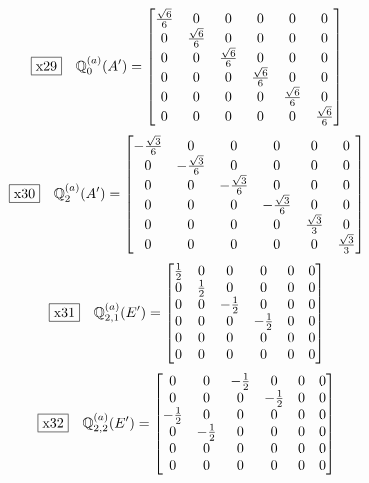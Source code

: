 \documentclass[fleqn,10pt,landscape]{jsarticle}
\begin{document}
\begin{dmath*}
\fbox{x29}\quad \mathbb{Q}_{0}^{(a)}(A^{\prime})=\begin{bmatrix} \frac{\sqrt{6}}{6} & 0 & 0 & 0 & 0 & 0 \\ 0 & \frac{\sqrt{6}}{6} & 0 & 0 & 0 & 0 \\ 0 & 0 & \frac{\sqrt{6}}{6} & 0 & 0 & 0 \\ 0 & 0 & 0 & \frac{\sqrt{6}}{6} & 0 & 0 \\ 0 & 0 & 0 & 0 & \frac{\sqrt{6}}{6} & 0 \\ 0 & 0 & 0 & 0 & 0 & \frac{\sqrt{6}}{6} \end{bmatrix}
\end{dmath*}
\begin{dmath*}
\fbox{x30}\quad \mathbb{Q}_{2}^{(a)}(A^{\prime})=\begin{bmatrix} - \frac{\sqrt{3}}{6} & 0 & 0 & 0 & 0 & 0 \\ 0 & - \frac{\sqrt{3}}{6} & 0 & 0 & 0 & 0 \\ 0 & 0 & - \frac{\sqrt{3}}{6} & 0 & 0 & 0 \\ 0 & 0 & 0 & - \frac{\sqrt{3}}{6} & 0 & 0 \\ 0 & 0 & 0 & 0 & \frac{\sqrt{3}}{3} & 0 \\ 0 & 0 & 0 & 0 & 0 & \frac{\sqrt{3}}{3} \end{bmatrix}
\end{dmath*}
\begin{dmath*}
\fbox{x31}\quad \mathbb{Q}_{2,1}^{(a)}(E^{\prime})=\begin{bmatrix} \frac{1}{2} & 0 & 0 & 0 & 0 & 0 \\ 0 & \frac{1}{2} & 0 & 0 & 0 & 0 \\ 0 & 0 & - \frac{1}{2} & 0 & 0 & 0 \\ 0 & 0 & 0 & - \frac{1}{2} & 0 & 0 \\ 0 & 0 & 0 & 0 & 0 & 0 \\ 0 & 0 & 0 & 0 & 0 & 0 \end{bmatrix}
\end{dmath*}
\begin{dmath*}
\fbox{x32}\quad \mathbb{Q}_{2,2}^{(a)}(E^{\prime})=\begin{bmatrix} 0 & 0 & - \frac{1}{2} & 0 & 0 & 0 \\ 0 & 0 & 0 & - \frac{1}{2} & 0 & 0 \\ - \frac{1}{2} & 0 & 0 & 0 & 0 & 0 \\ 0 & - \frac{1}{2} & 0 & 0 & 0 & 0 \\ 0 & 0 & 0 & 0 & 0 & 0 \\ 0 & 0 & 0 & 0 & 0 & 0 \end{bmatrix}
\end{dmath*}
\end{document}
